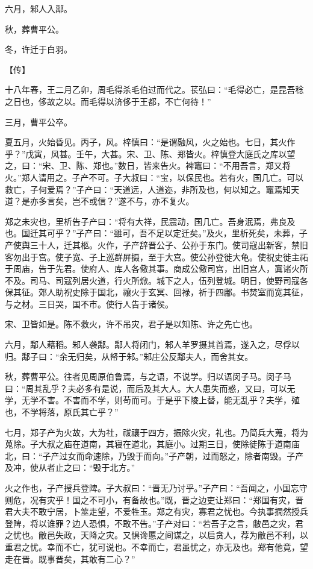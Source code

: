 \documentclass[a4paper,12pt,UTF8,twoside]{ctexbook}
\begin{document}
六月，邾人入鄅。

秋，葬曹平公。

冬，许迁于白羽。

【传】

十八年春，王二月乙卯，周毛得杀毛伯过而代之。苌弘曰：“毛得必亡，是昆吾稔之日也，侈故之以。而毛得以济侈于王都，不亡何待！”

三月，曹平公卒。

夏五月，火始昏见。丙子，风。梓慎曰：“是谓融风，火之始也。七日，其火作乎？”戊寅，风甚。壬午，大甚。宋、卫、陈、郑皆火。梓慎登大庭氏之库以望之，曰：“宋、卫、陈、郑也。”数日，皆来告火。裨竈曰：“不用吾言，郑又将火。”郑人请用之。子产不可。子大叔曰：“宝，以保民也。若有火，国几亡。可以救亡，子何爱焉？”子产曰：“天道远，人道迩，非所及也，何以知之。竈焉知天道？是亦多言矣，岂不或信？”遂不与，亦不复火。

郑之未灾也，里析告子产曰：“将有大祥，民震动，国几亡。吾身泯焉，弗良及也。国迁其可乎？”子产曰：“雖可，吾不足以定迁矣。”及火，里析死矣，未葬，子产使舆三十人，迁其柩。火作，子产辞晋公子、公孙于东门。使司寇出新客，禁旧客勿出于宫。使子宽、子上巡群屏摄，至于大宫。使公孙登徙大龟。使祝史徙主祏于周庙，告于先君。使府人、库人各儆其事。商成公儆司宫，出旧宫人，寘诸火所不及。司马、司寇列居火道，行火所焮。城下之人，伍列登城。明日，使野司寇各保其征。郊人助祝史除于国北，禳火于玄冥、回禄，祈于四鄘。书焚室而宽其征，与之材。三日哭，国不市。使行人告于诸侯。

宋、卫皆如是。陈不救火，许不吊灾，君子是以知陈、许之先亡也。

六月，鄅人藉稻。邾人袭鄅。鄅人将闭门，邾人羊罗摄其首焉，遂入之，尽俘以归。鄅子曰：“余无归矣，从帑于邾。”邾庄公反鄅夫人，而舍其女。

秋，葬曹平公。往者见周原伯鲁焉，与之语，不说学。归以语闵子马。闵子马曰：“周其乱乎？夫必多有是说，而后及其大人。大人患失而惑，又曰，可以无学，无学不害。不害而不学，则苟而可。于是乎下陵上替，能无乱乎？夫学，殖也，不学将落，原氏其亡乎？”

七月，郑子产为火故，大为社，祓禳于四方，振除火灾，礼也。乃简兵大蒐，将为蒐除。子大叔之庙在道南，其寝在道北，其庭小。过期三日，使除徒陈于道南庙北，曰：“子产过女而命速除，乃毁于而向。”子产朝，过而怒之，除者南毁。子产及冲，使从者止之曰：“毁于北方。”

火之作也，子产授兵登陴。子大叔曰：“晋无乃讨乎。”子产曰：“吾闻之，小国忘守则危，况有灾乎！国之不可小，有备故也。”既，晋之边吏让郑曰：“郑国有灾，晋君大夫不敢宁居，卜筮走望，不爱牲玉。郑之有灾，寡君之忧也。今执事撊然授兵登陴，将以谁罪？边人恐惧，不敢不告。”子产对曰：“若吾子之言，敝邑之灾，君之忧也。敝邑失政，天降之灾。又惧谗慝之间谋之，以启贪人，荐为敝邑不利，以重君之忧。幸而不亡，犹可说也。不幸而亡，君虽忧之，亦无及也。郑有他竟，望走在晋。既事晋矣，其敢有二心？”
\end{document}
